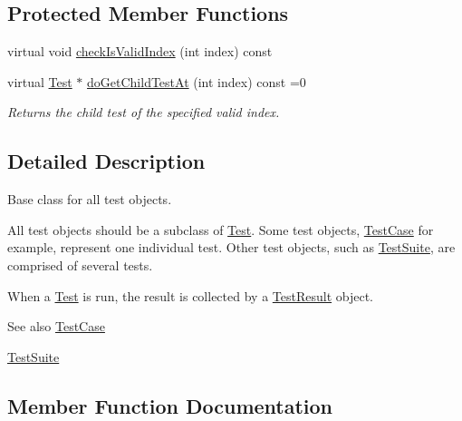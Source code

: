 \subsection*{Protected Member Functions}
\begin{DoxyCompactItemize}
\item 
virtual void \hyperlink{class_test_a417a24c245c6273c7886680ab3e30849}{check\+Is\+Valid\+Index} (int index) const 
\item 
virtual \hyperlink{class_test}{Test} $\ast$ \hyperlink{class_test_affd3d7af96db3bf9035975ad22fc2765}{do\+Get\+Child\+Test\+At} (int index) const  =0
\begin{DoxyCompactList}\small\item\em Returns the child test of the specified valid index. \end{DoxyCompactList}\end{DoxyCompactItemize}


\subsection{Detailed Description}
Base class for all test objects.

All test objects should be a subclass of \hyperlink{class_test}{Test}. Some test objects, \hyperlink{class_test_case}{Test\+Case} for example, represent one individual test. Other test objects, such as \hyperlink{class_test_suite}{Test\+Suite}, are comprised of several tests. 

When a \hyperlink{class_test}{Test} is run, the result is collected by a \hyperlink{class_test_result}{Test\+Result} object.

\begin{DoxySeeAlso}{See also}
\hyperlink{class_test_case}{Test\+Case} 

\hyperlink{class_test_suite}{Test\+Suite} 
\end{DoxySeeAlso}


\subsection{Member Function Documentation}

